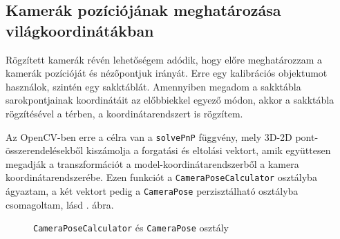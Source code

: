 \subsection{Kamerák pozíciójának meghatározása világkoordinátákban}


Rögzített kamerák révén lehetőségem adódik, hogy előre meghatározzam a kamerák pozícióját és nézőpontjuk irányát. Erre egy kalibrációs objektumot használok, szintén egy sakktáblát. Amennyiben megadom a sakktábla sarokpontjainak koordinátáit az előbbiekkel egyező módon, akkor a sakktábla rögzítésével a térben, a koordinátarendszert is rögzítem. 

Az OpenCV-ben erre a célra van a \texttt{solvePnP} függvény, mely 3D-2D pont-összerendelésekből kiszámolja a forgatási és eltolási vektort, amik együttesen megadják a transzformációt a model-koordinátarendszerből a kamera koordinátarendszerébe. Ezen funkciót a \texttt{CameraPoseCalculator} osztályba ágyaztam, a két vektort pedig a \texttt{CameraPose} perzisztálható osztályba csomagoltam, lásd . ábra.

\begin{figure}[tbh]
\centering


\caption{\texttt{CameraPoseCalculator} és \texttt{CameraPose} osztály \label{fig:cd:pose}}
\end{figure}

